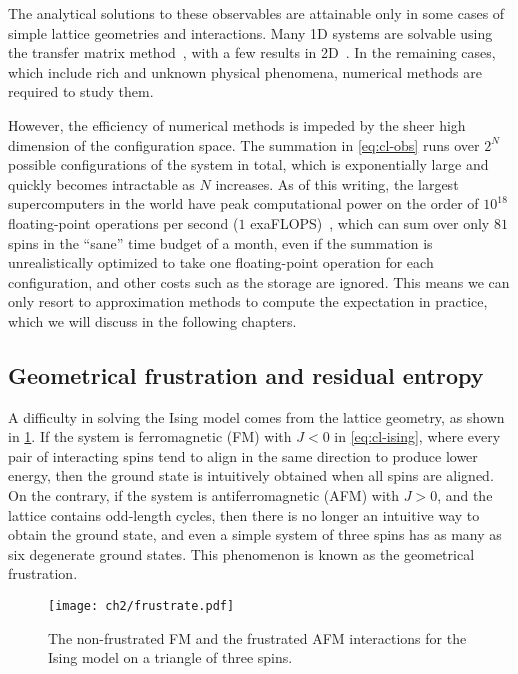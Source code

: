 The analytical solutions to these observables are attainable only in some cases of simple lattice geometries and interactions. Many 1D systems are solvable using the transfer matrix method~\cite{chaikin1995principles5}, with a few results in 2D~\cite{baxter1995solvable, march2016exactly, caravelli2022some}. In the remaining cases, which include rich and unknown physical phenomena, numerical methods are required to study them.

However, the efficiency of numerical methods is impeded by the sheer high dimension of the configuration space. The summation in \cref{eq:cl-obs} runs over $2^N$ possible configurations of the system in total, which is exponentially large and quickly becomes intractable as $N$ increases. As of this writing, the largest supercomputers in the world have peak computational power on the order of $10^{18}$ floating-point operations per second ($1$ exaFLOPS)~\cite{kogge2022frontier}, which can sum over only $81$ spins in the ``sane'' time budget of a month, even if the summation is unrealistically optimized to take one floating-point operation for each configuration, and other costs such as the storage are ignored. This means we can only resort to approximation methods to compute the expectation in practice, which we will discuss in the following chapters.

\subsection{Geometrical frustration and residual entropy}
\label{sec:frustrate}

A difficulty in solving the Ising model comes from the lattice geometry, as shown in \cref{fig:frustrate}. If the system is ferromagnetic (FM) with $J < 0$ in \cref{eq:cl-ising}, where every pair of interacting spins tend to align in the same direction to produce lower energy, then the ground state is intuitively obtained when all spins are aligned. On the contrary, if the system is antiferromagnetic (AFM) with $J > 0$, and the lattice contains odd-length cycles, then there is no longer an intuitive way to obtain the ground state, and even a simple system of three spins has as many as six degenerate ground states. This phenomenon is known as the geometrical frustration.

\begin{figure}[htb]
\centering
\texttt{[image: ch2/frustrate.pdf]}
\caption[Frustrated interactions in Ising model]{
The non-frustrated FM and the frustrated AFM interactions for the Ising model on a triangle of three spins.
}
\label{fig:frustrate}
\end{figure}

